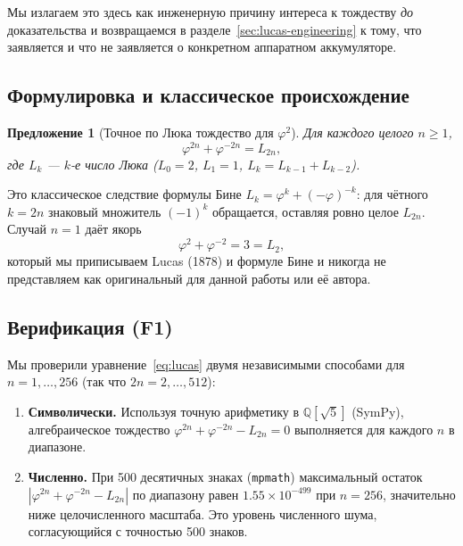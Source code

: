 \documentclass[11pt,a4paper]{article}
\theoremstyle{plain}
\newtheorem{proposition}{Предложение}
\begin{document}
Мы излагаем это здесь как инженерную причину интереса к тождеству \emph{до}
доказательства и возвращаемся в разделе~\ref{sec:lucas-engineering} к тому, что
заявляется и что не заявляется о конкретном аппаратном аккумуляторе.

\subsection{Формулировка и классическое происхождение}\label{sec:lucas-statement}

\begin{proposition}[Точное по Люка тождество для $\varphi^{2}$]
\label{prop:lucas}
Для каждого целого \(n \ge 1\),
\begin{equation}
\varphi^{2n} + \varphi^{-2n} = L_{2n},
\label{eq:lucas}
\end{equation}
где \(L_k\) --- \(k\)-е число Люка (\(L_0 = 2\), \(L_1 = 1\),
\(L_k = L_{k-1} + L_{k-2}\)).
\end{proposition}

Это классическое следствие формулы Бине
\(L_k = \varphi^{k} + (-\varphi)^{-k}\): для чётного \(k = 2n\) знаковый множитель
\((-1)^{k}\) обращается, оставляя ровно целое \(L_{2n}\). Случай \(n = 1\) даёт
якорь
\begin{equation}
\varphi^{2} + \varphi^{-2} = 3 = L_{2},
\label{eq:trinity-anchor}
\end{equation}
который мы приписываем Lucas (1878) и формуле Бине и никогда не представляем как
оригинальный для данной работы или её автора.

\subsection{Верификация (F1)}\label{sec:lucas-verification}

Мы проверили уравнение~\eqref{eq:lucas} двумя независимыми способами для
\(n = 1,\dots,256\) (так что \(2n = 2,\dots,512\)):

\begin{enumerate}\setlength{\itemsep}{2pt}
\item \textbf{Символически.} Используя точную арифметику в
\(\mathbb{Q}[\sqrt{5}]\) (SymPy), алгебраическое тождество
\(\varphi^{2n} + \varphi^{-2n} - L_{2n} = 0\) выполняется для каждого \(n\) в
диапазоне.
\item \textbf{Численно.} При 500 десятичных знаках (\texttt{mpmath})
максимальный остаток \(|\varphi^{2n} + \varphi^{-2n} - L_{2n}|\) по диапазону
равен \(1.55 \times 10^{-499}\) при \(n = 256\), значительно ниже целочисленного
масштаба. Это уровень численного шума, согласующийся с точностью 500 знаков.
\end{enumerate}
\end{document}

